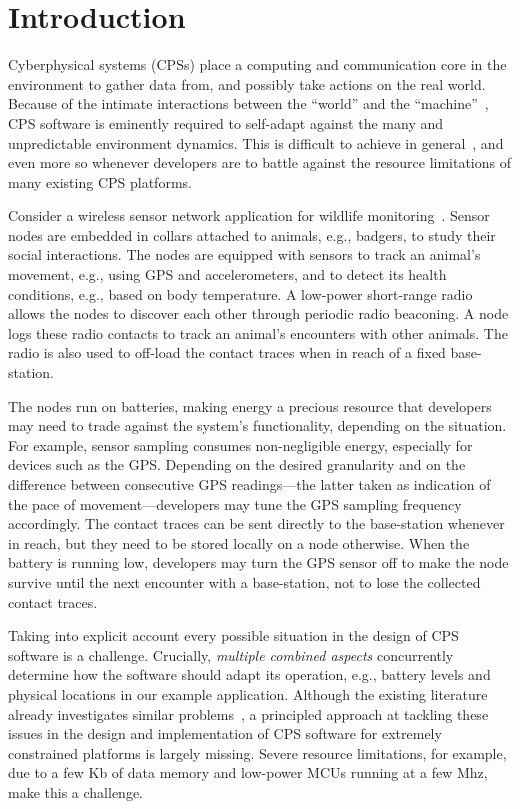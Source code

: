 \section{Introduction}

Cyberphysical systems (CPSs) place a computing and communication core
in the environment to gather data from, and possibly take actions on
the real world. Because of the intimate interactions between the
``world'' and the ``machine''~\cite{Jackson:1995:WM:225014.225041},
CPS software is eminently required to self-adapt against the many and
unpredictable environment dynamics. This is difficult to achieve in
general~\cite{cheng:adaptive}, and even more so whenever developers are to
battle against the resource limitations of many existing CPS
platforms.

 Consider a wireless sensor network application for
wildlife monitoring~\cite{pasztor10:selective}.  Sensor nodes are
embedded in collars attached to animals, e.g., badgers, to study their
social interactions. The nodes are equipped with sensors to track an
animal's movement, e.g., using GPS and accelerometers, and to detect
its health conditions, e.g., based on body temperature.  A low-power
short-range radio allows the nodes to discover each other through
periodic radio beaconing.  A node logs these radio contacts to track
an animal's encounters with other animals. The radio is also used to
off-load the contact traces when in reach of a fixed base-station.

The nodes run on batteries, making energy a precious resource that
developers may need to trade against the system's functionality,
depending on the situation. For example, sensor sampling consumes
non-negligible energy, especially for devices such as the
GPS. Depending on the desired granularity and on the difference
between consecutive GPS readings---the latter taken as indication of
the pace of movement---developers may tune the GPS sampling frequency
accordingly. The contact traces can be sent directly to the
base-station whenever in reach, but they need to be stored locally on
a node otherwise.  When the battery is running low, developers may
turn the GPS sensor off to make the node survive until the next
encounter with a base-station, not to lose the collected contact
traces.

 Taking into explicit account every possible
situation in the design of CPS software is a challenge. Crucially,
\emph{multiple combined aspects} concurrently determine how the
software should adapt its operation, e.g., battery levels and physical
locations in our example application. Although the existing literature
already investigates similar problems~\cite{cheng:adaptive}, a
principled approach at tackling these issues in the design and
implementation of CPS software for extremely constrained platforms is
largely missing. Severe resource limitations, for example, due to a
few Kb of data memory and low-power MCUs running at a few Mhz, make
this a challenge.

